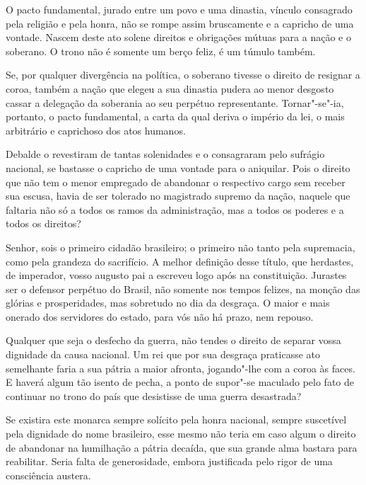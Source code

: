 \begin{linenumbers}
O pacto fundamental, jurado entre um povo e uma dinastia, vínculo
consagrado pela religião e pela honra, não se rompe assim bruscamente e
a capricho de uma vontade. Nascem deste ato solene direitos e
obrigações mútuas para a nação e o soberano. O trono não é somente um
berço feliz, é um túmulo também.

Se, por qualquer divergência na política, o soberano tivesse o direito
de resignar a coroa, também a nação que elegeu a sua dinastia pudera ao
menor desgosto cassar a delegação da soberania ao seu perpétuo
representante. Tornar"-se"-ia, portanto, o pacto fundamental, a carta
da qual deriva o império da lei, o mais arbitrário e caprichoso dos atos humanos.

Debalde o revestiram de tantas solenidades e o consagraram pelo sufrágio
nacional, se bastasse o capricho de uma vontade para o aniquilar. Pois
o direito que não tem o menor empregado de abandonar o respectivo cargo
sem receber sua escusa, havia de ser tolerado no magistrado supremo da
nação, naquele que faltaria não só a todos os ramos da administração,
mas a todos os poderes e a todos os direitos?

Senhor, sois o primeiro cidadão brasileiro; o primeiro não tanto pela
supremacia, como pela grandeza do sacrifício. A melhor definição desse
título, que herdastes, de imperador, vosso augusto pai a escreveu logo
após na constituição. Jurastes ser o defensor perpétuo do Brasil, não
somente nos tempos felizes, na monção das glórias e prosperidades, mas
sobretudo no dia da desgraça. O maior e mais onerado dos servidores do
estado, para vós não há prazo, nem repouso.

Qualquer que seja o desfecho da guerra, não tendes o direito de separar
vossa dignidade da causa nacional. Um rei que por sua desgraça
praticasse ato semelhante faria a sua pátria a maior afronta,
jogando"-lhe com a coroa às faces. E haverá algum tão isento de pecha,
a ponto de supor"-se maculado pelo fato de continuar no trono do país
que desistisse de uma guerra desastrada? 

Se existira este monarca sempre solícito pela honra nacional, sempre
suscetível pela dignidade do nome brasileiro, esse mesmo não teria em
caso algum o direito de abandonar na humilhação a pátria decaída, que
sua grande alma bastara para reabilitar. Seria falta de generosidade,
embora justificada pelo rigor de uma consciência austera.

\end{linenumbers}

\sectionitem

